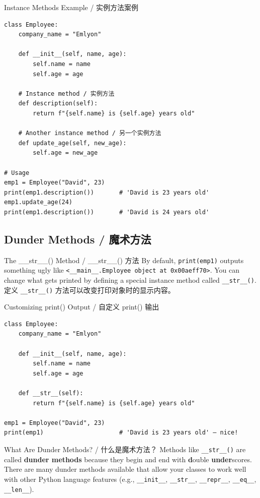 \documentclass[11pt,a4paper]{article}
\begin{document}
\begin{examplebox}{Instance Methods Example / 实例方法案例}
\begin{lstlisting}
class Employee:
    company_name = "Emlyon"

    def __init__(self, name, age):
        self.name = name
        self.age = age

    # Instance method / 实例方法
    def description(self):
        return f"{self.name} is {self.age} years old"

    # Another instance method / 另一个实例方法
    def update_age(self, new_age):
        self.age = new_age

# Usage
emp1 = Employee("David", 23)
print(emp1.description())       # 'David is 23 years old'
emp1.update_age(24)
print(emp1.description())       # 'David is 24 years old'
\end{lstlisting}
\end{examplebox}

\subsection{Dunder Methods / 魔术方法}

\begin{concept}{The \_\_str\_\_() Method / \_\_str\_\_() 方法}
    By default, \texttt{print(emp1)} outputs something ugly like \texttt{<\_\_main\_\_.Employee object at 0x00aeff70>}. You can change what gets printed by defining a special instance method called \texttt{\_\_str\_\_()}. \\
    定义 \texttt{\_\_str\_\_()} 方法可以改变打印对象时的显示内容。
\end{concept}

\begin{examplebox}{Customizing print() Output / 自定义 print() 输出}
\begin{lstlisting}
class Employee:
    company_name = "Emlyon"

    def __init__(self, name, age):
        self.name = name
        self.age = age

    def __str__(self):
        return f"{self.name} is {self.age} years old"

emp1 = Employee("David", 23)
print(emp1)                     # 'David is 23 years old' — nice!
\end{lstlisting}
\end{examplebox}

\begin{concept}{What Are Dunder Methods? / 什么是魔术方法？}
    Methods like \texttt{\_\_str\_\_()} are called \textbf{dunder methods} because they begin and end with \textbf{d}ouble \textbf{under}scores. There are many dunder methods available that allow your classes to work well with other Python language features (e.g., \texttt{\_\_init\_\_}, \texttt{\_\_str\_\_}, \texttt{\_\_repr\_\_}, \texttt{\_\_eq\_\_}, \texttt{\_\_len\_\_}).
\end{concept}
\end{document}
